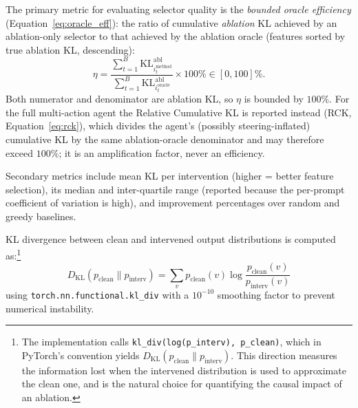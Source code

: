 The primary metric for evaluating selector quality is the \emph{bounded oracle
efficiency} (Equation~\ref{eq:oracle_eff}): the ratio of cumulative \emph{ablation}
KL achieved by an ablation-only selector to that achieved by the ablation oracle
(features sorted by true ablation KL, descending):
\begin{equation}
  \eta = \frac{\sum_{t=1}^{B} \text{KL}^{\text{abl}}_{i_t^{\text{method}}}}
                                  {\sum_{t=1}^{B} \text{KL}^{\text{abl}}_{i_t^{\text{oracle}}}}
                             \times 100\% \in [0,100]\%.
\end{equation}
Both numerator and denominator are ablation KL, so $\eta$ is bounded by
$100\%$. For the full multi-action agent the Relative Cumulative KL is reported
instead (RCK, Equation~\ref{eq:rck}), which divides the agent's (possibly
steering-inflated) cumulative KL by the same ablation-oracle denominator and may
therefore exceed $100\%$; it is an amplification factor, never an efficiency.

Secondary metrics include mean KL per intervention (higher = better
feature selection), its median and inter-quartile range (reported because the
per-prompt coefficient of variation is high), and improvement percentages over
random and greedy baselines.

KL divergence between clean and intervened output distributions is
computed as:\footnote{The implementation calls
\texttt{kl\_div(log(p\_interv), p\_clean)}, which in PyTorch's
convention yields $D_{\text{KL}}(p_{\text{clean}} \| p_{\text{interv}})$.
This direction measures the information lost when the intervened
distribution is used to approximate the clean one, and is the natural
choice for quantifying the causal impact of an ablation.}
\begin{equation}
  D_{\text{KL}}(p_{\text{clean}} \| p_{\text{interv}}) =
  \sum_v p_{\text{clean}}(v) \log \frac{p_{\text{clean}}(v)}{p_{\text{interv}}(v)}
\end{equation}
using \texttt{torch.nn.functional.kl\_div} with a $10^{-10}$ smoothing
factor to prevent numerical instability.
